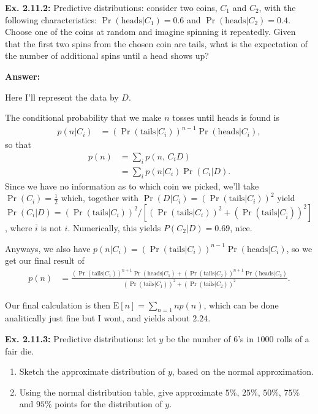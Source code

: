 \documentclass{article}
\newcommand\oname\operatorname
\begin{document}
\textbf{Ex. 2.11.2: }Predictive distributions: consider two coins, $C_1$ and $C_2$, with the following characteristics: $\oname{Pr}(\text{heads}|C_1)=0.6$ and $\oname{Pr}(\text{heads}|C_2)=0.4$. Choose one of the coins at random and imagine spinning it repeatedly. Given that the first two spins from the chosen coin are tails, what is the expectation of the number of additional spins until a head shows up?

\textbf{Answer:}

Here I'll represent the data by $D$.

The conditional probability that we make $n$ tosses until heads is found is
\begin{align*}
	p(n|C_i)&=\left(\oname{Pr}(\text{tails}|C_i)\right)^{n-1}\oname{Pr}(\text{heads}|C_i),
\end{align*}
so that
\begin{align*}
	p(n)&=\sum_ip(n,\,C_iD)\\
	&=\sum_ip(n|C_i)\oname{Pr}(C_i|D).
\end{align*}
Since we have no information as to which coin we picked, we'll take $\oname{Pr}(C_i)=\frac12$ which, together with $\oname{Pr}(D|C_i)=\left(\oname{Pr}(\text{tails}|C_i)\right)^2$ yield $\oname{Pr}(C_i|D)=\left(\oname{Pr}(\text{tails}|C_i)\right)^2/\left[\left(\oname{Pr}(\text{tails}|C_i)\right)^2+\left(\oname{Pr}(\text{tails}|C_{\overline{i}})\right)^2\right]$, where $\overline{i}$ is not $i$. Numerically, this yields $P(C_2|D)=0.69$, nice.

Anyways, we also have $p(n|C_i)=\left(\oname{Pr}(\text{tails}|C_i)\right)^{n-1}\oname{Pr}(\text{heads}|C_i)$, so we get our final result of
\begin{align*}
	p(n)&=\frac{\left(\oname{Pr}(\text{tails}|C_1)\right)^{n+1}\oname{Pr}(\text{heads}|C_1)+\left(\oname{Pr}(\text{tails}|C_2)\right)^{n+1}\oname{Pr}(\text{heads}|C_2)}{\left(\oname{Pr}(\text{tails}|C_1)\right)^2+\left(\oname{Pr}(\text{tails}|C_2)\right)^2}.
\end{align*}

Our final calculation is then $\mathrm E[n]=\sum_{n=1}np(n)$, which can be done analitically just fine but I wont, and yields about $2.24$.

\textbf{Ex. 2.11.3: }Predictive distributions: let $y$ be the number of $6$'s in $1000$ rolls of a fair die.
\begin{enumerate}[label=\alph*]
	\item Sketch the approximate distribution of $y$, based on the normal approximation.
	\item Using the normal distribution table, give approximate $5\%$, $25\%$, $50\%$, $75\%$ and $95\%$ points for the distribution of $y$.
\end{enumerate}
\end{document}
